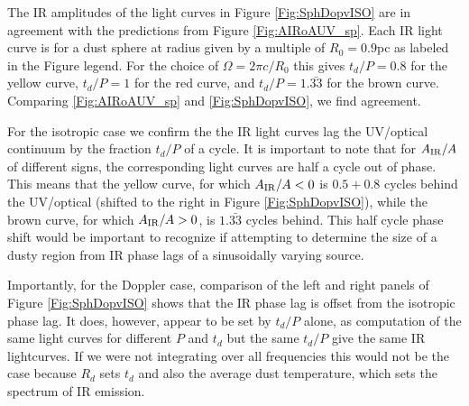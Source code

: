 The IR amplitudes of the light curves in Figure \ref{Fig:SphDopvISO} are in
agreement with the predictions from Figure \ref{Fig:AIRoAUV_sp}. Each IR light
curve is for a dust sphere at radius given by a multiple of $R_0 = 0.9$pc as
labeled in the Figure legend. For the choice of $\Omega = 2\pi c/R_0$ this
gives $t_d/P = 0.8$ for the yellow curve, $t_d/P = 1$ for the red curve, and
$t_d/P = 1.\bar{33}$ for the brown curve. Comparing \ref{Fig:AIRoAUV_sp} and
\ref{Fig:SphDopvISO}, we find agreement.

For the isotropic case we confirm the the IR light curves lag the UV/optical
continuum by the fraction $t_d/P$ of a cycle. It is important to note that for
$A_{\rm{IR}}/A$ of different signs, the corresponding light curves are half a
cycle out of phase. This means that the yellow curve, for which $A_{\rm{IR}}/A
< 0$ is $0.5 + 0.8$ cycles behind the UV/optical (shifted to the right in
Figure \ref{Fig:SphDopvISO}), while the brown curve, for which $A_{\rm{IR}}/A
> 0$, is $1.\bar{33}$ cycles behind. This half cycle phase shift would be
important to recognize if attempting to determine the size of a dusty region
from IR phase lags of a sinusoidally varying source.

Importantly, for the Doppler case, comparison of the left and right panels of
Figure \ref{Fig:SphDopvISO} shows that the IR phase lag is offset from the
isotropic phase lag. It does, however, appear to be set by $t_d/P$ alone, as
computation of the same light curves for different $P$ and $t_d$ but the same
$t_d/P$ give the same IR lightcurves. If we were not integrating over all
frequencies this would not be the case because $R_d$ sets $t_d$ and also the
average dust temperature, which sets the spectrum of IR emission.





